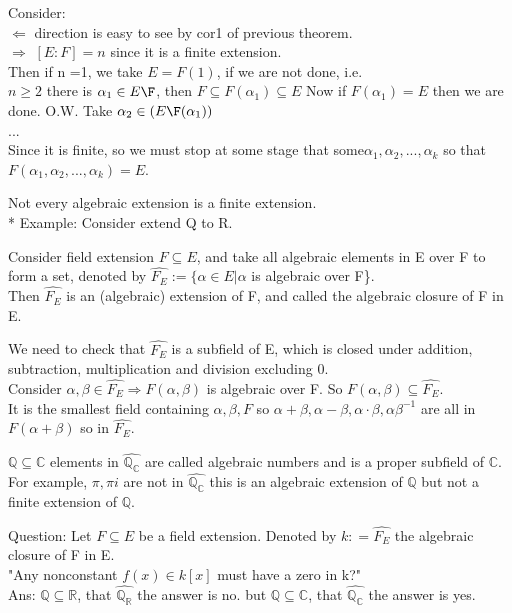 \documentclass{article}
\newcommand\R{\ensuremath{\mathbb{R}}}
\newcommand\Q{\ensuremath{\mathbb{Q}}}
\newcommand\C{\ensuremath{\mathbb{C}}}
\begin{document}
\begin{Proof}
    Consider:
    \\$\Leftarrow$ direction is easy to see by cor1 of previous theorem.
    \\ $\Rightarrow$ $[E:F] = n$ since it is a finite extension.
    \\ Then if n =1, we take $E = F(1)$, if we are not done, i.e.
    \\ $n\geq 2$ there is $\alpha_1 \in E\F$, then $F \subseteq F(\alpha_1) \subseteq E$ Now if $F(\alpha_1) = E$ then we are done. O.W. Take $\alpha_2 \in (E\F(\alpha_1))$ 
    \\
    ...
    \\ Since it is finite, so we must stop at some stage that some$\alpha_1, \alpha_2, ..., \alpha_k$ so that $F(\alpha_1, \alpha_2, ..., \alpha_k) = E$.
\end{Proof}

\begin{note}
    Not every algebraic extension is a finite extension.
\\    * Example: Consider extend Q to R.
\end{note}

\begin{Def}
    Consider field extension $F \subseteq E$, and take all algebraic elements in E over F to form a set, denoted by $\hat{F_E}:= \{\alpha \in E | \alpha $ is algebraic over F\}.
    \\ Then $\hat{F_E}$ is an (algebraic) extension of F, and called the algebraic closure of F in E.
\end{Def}
\begin{Proof}
    We need to check that $\hat{F_E}$ is a subfield of E, which is closed under addition, subtraction, multiplication and division excluding 0.
    \\ Consider $\alpha, \beta \in \hat{F_E} \Rightarrow F(\alpha, \beta) $ is algebraic over F. So $F(\alpha, \beta) \subseteq \hat{F_E}$.
    \\ It is the smallest field containing $\alpha, \beta, F$ so $\alpha+\beta,\alpha-\beta, \alpha \cdot \beta, \alpha\beta^{-1}$ are all in $F(\alpha+\beta)$ so in $\hat{F_E}$.
\end{Proof}
\begin{Example}
    $\Q \subseteq \C$ elements in $\hat{\Q_\C}$ are called algebraic numbers and is a proper subfield of $\C$. \\For example, $\pi , \pi i$ are not in $\hat{\Q_\C}$ this is an algebraic extension of $\Q$ but not a finite extension of $\Q$.
\end{Example}
\newpage
\begin{note}
    Question: Let $F \subseteq E$ be a field extension. Denoted by $k: = \hat{F_E}$ the algebraic closure of F in E.
\\ "Any nonconstant $f(x) \in k[x]$ must have a zero in k?"
\\Ans: $\Q \subseteq \R$, that $\hat{\Q_\R}$ the answer is no.
but $\Q \subseteq \C$, that $\hat{\Q_\C}$ the answer is yes.
\end{note}
\end{document}
